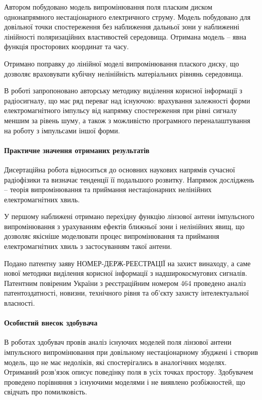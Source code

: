 Автором побудовано модель випромінювання поля пласким диском однонапрямного 
нестаціонарного електричного струму. Модель побудовано для довільної точки 
спостереження без наближення дальньої зони у наближенні лінійності 
поляризаційних властивостей середовища. Отримана модель -- явна функція 
просторових координат та часу.

Отримано поправку до лінійної моделі випромінювання плаского диску, що 
дозволяє враховувати кубічну нелінійність матеріальних рівнянь середовища.

В роботі запропоновано авторську методику виділення корисної інформації з 
радіосигналу, що має ряд переваг над існуючою: врахування залежності форми 
електромагнітного імпульсу від напрямку спостереження при рівні сигналу меншим 
за рівень шуму, а також з можливістю програмного переналаштування на роботу з 
імпульсами іншої форми.

\paragraph{Практичне значення отриманих результатів}

Дисертаційна робота відноситься до основних наукових напрямів сучасної 
радіофізики та визначає тенденції її подальшого розвитку. Напрямок
досліджень -- теорія випромінювання та приймання нестаціонарних 
нелінійних електромагнітних хвиль.

У першому наближені отримано перехідну функцію лінзової антени імпульсного 
випромінювання з урахуванням ефектів ближньої зони і нелінійних 
явищ, що дозволяє якісніше моделювати процес випромінювання та приймання 
електромагнітних хвиль з застосуванням такої антени.

Подано патентну заяву НОМЕР-ДЕРЖ-РЕЕСТРАЦІЇ на захист винаходу, а саме 
нової методики виділення корисної інформації з надширокосмугових сигналів. 
Патентним повіреним України з реєстраційним номером 464 проведено аналіз 
патентоздатності, новизни, технічного рівня та об'єкту захисту 
інтелектуальної власності.

\paragraph{Особистий внесок здобувача}

В роботах \cite{my:Telecom2018, my:UKRCON2017, my:UKRCON2019} здобувач провів
аналіз існуючих моделей поля лінзової антени імпульсного випромінювання 
при довільному нестаціонарному збуджені і створив модель, що не має недоліків,
які спостерігались в аналогічних моделях. Отриманий розв'язок описує 
поведінку поля в усіх точках простору. Здобувачем проведено порівняння з 
існуючими моделями і не виявлено розбіжностей, що свідчать про помилковість.

